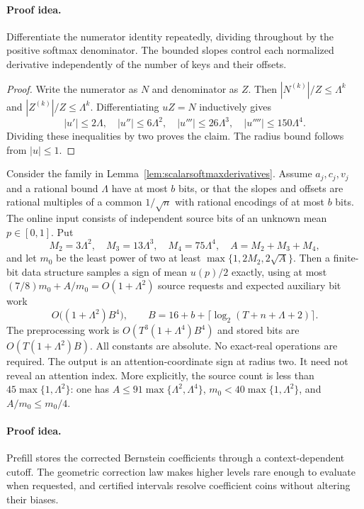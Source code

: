 \paragraph{Proof idea.}
Differentiate the numerator identity repeatedly, dividing throughout by the positive softmax denominator.  The bounded slopes control each normalized derivative independently of the number of keys and their offsets.

\begin{proof}
Write the numerator as $N$ and denominator as $Z$.  Then
$|N^{(k)}|/Z\le\Lambda^k$ and
$|Z^{(k)}|/Z\le\Lambda^k$.
Differentiating $uZ=N$ inductively gives
\[
 |u'|\le2\Lambda,\quad |u''|\le6\Lambda^2,\quad
 |u'''|\le26\Lambda^3,\quad |u''''|\le150\Lambda^4.
\]
Dividing these inequalities by two proves the claim.  The radius
bound follows from $|u|\le1$.
\end{proof}

\begin{theorem}
\label{thm:implicitrankone}
Consider the family in Lemma~\ref{lem:scalarsoftmaxderivatives}.
Assume $a_j,c_j,v_j$ and a rational bound $\Lambda$ have at most
$b$ bits, or that the slopes and offsets are rational multiples
of a common $1/\sqrt n$ with rational encodings of at most $b$ bits.
The online input consists of independent source bits of an unknown
mean $p\in[0,1]$.  Put
\[
 M_2=3\Lambda^2,\quad M_3=13\Lambda^3,\quad
 M_4=75\Lambda^4,\quad A=M_2+M_3+M_4,
\]
and let $m_0$ be the least power of two at least
$\max\{1,2M_2,2\sqrt A\}$.  Then a finite-bit data structure
samples a sign of mean $u(p)/2$ exactly, using at most
$(7/8)m_0+A/m_0=O(1+\Lambda^2)$ source requests and expected
auxiliary bit work
\[
 O\bigl((1+\Lambda^2)B^4\bigr),\qquad
 B=16+b+\lceil\log_2(T+n+\Lambda+2)\rceil.
\]
The preprocessing work is
$O(T^3(1+\Lambda^4)B^4)$ and stored bits are
$O(T(1+\Lambda^2)B)$.
All constants are absolute.  No exact-real operations are required.  The output is an attention-coordinate sign at radius
two.  It need not reveal an attention index.
More explicitly, the source count is less than
$45\max\{1,\Lambda^2\}$: one has
$A\le91\max\{\Lambda^2,\Lambda^4\}$,
$m_0<40\max\{1,\Lambda^2\}$, and $A/m_0\le m_0/4$.
\end{theorem}

\paragraph{Proof idea.}
Prefill stores the corrected Bernstein coefficients through a context-dependent cutoff.  The geometric correction law makes higher levels rare enough to evaluate when requested, and certified intervals resolve coefficient coins without altering their biases.

